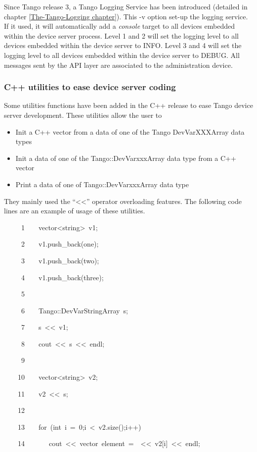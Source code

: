 Since Tango release 3, a Tango Logging Service has been introduced
(detailed in chapter \ref{The-Tango-Logging chapter}). This -v option
set-up the logging service. If it used, it will automatically add
a \emph{console} target to all devices embedded within the device
server process. Level 1 and 2 will set the logging level to all devices
embedded within the device server to INFO. Level 3 and 4 will set
the logging level to all devices embedded within the
device server to DEBUG. All messages sent by the API layer are associated
to the administration device.

\subsubsection{C++ utilities to ease device server coding}

Some utilities functions have been added in the C++ release to ease
Tango device server development. These utilities allow the user to
\begin{itemize}
\item Init a C++ vector from a data of one of the Tango DevVarXXXArray data
types 
\item Init a data of one of the Tango::DevVarxxxArray data type from a C++
vector
\item Print a data of one of Tango::DevVarxxxArray data type
\end{itemize}
They mainly used the ``<\textcompwordmark{}<''
operator overloading features. The following code lines are an example
of usage of these utilities.


\begin{lyxcode}
~~~~~1~~~~vector<string>~v1;

~~~~~2~~~~v1.push\_back(\textquotedbl{}one\textquotedbl{});

~~~~~3~~~~v1.push\_back(\textquotedbl{}two\textquotedbl{});

~~~~~4~~~~v1.push\_back(\textquotedbl{}three\textquotedbl{});

~~~~~5~~~~~~~~~~

~~~~~6~~~~Tango::DevVarStringArray~s;

~~~~~7~~~~s~<\textcompwordmark{}<~v1;

~~~~~8~~~~cout~<\textcompwordmark{}<~s~<\textcompwordmark{}<~endl;

~~~~~9~~

~~~~10~~~~vector<string>~v2;

~~~~11~~~~v2~<\textcompwordmark{}<~s;

~~~~12~~~~~~~~~~

~~~~13~~~~for~(int~i~=~0;i~<~v2.size();i++)

~~~~14~~~~~~~cout~<\textcompwordmark{}<~\textquotedbl{}vector~element~=~\textquotedbl{}~<\textcompwordmark{}<~v2{[}i{]}~<\textcompwordmark{}<~endl;
\end{lyxcode}


